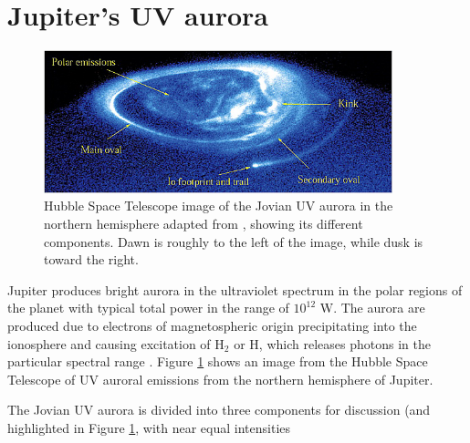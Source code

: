 \section{Jupiter's UV aurora}

\begin{figure}
    \centering
    \includegraphics[width=0.9\textwidth]{images1/jupiter-uv-aurora-1.png}
    \caption{Hubble Space Telescope image of the Jovian UV aurora in the northern hemisphere adapted from \protect{}, showing its different components. Dawn is roughly to the left of the image, while dusk is toward the right.}
    \label{fig:jupiter-uv-aurora}
\end{figure}

Jupiter produces bright aurora in the ultraviolet spectrum in the polar regions of the planet with typical total power in the range of $10^{12}$ W. The aurora are produced due to electrons of magnetospheric origin precipitating into the ionosphere and causing excitation of H$_2$ or H, which releases photons in the particular spectral range \cite{Grodent2015}. Figure \ref{fig:jupiter-uv-aurora} shows an image from the Hubble Space Telescope of UV auroral emissions from the northern hemisphere of Jupiter.

The Jovian UV aurora is divided into three components for discussion (and highlighted in Figure 
\ref{fig:jupiter-uv-aurora}, with near equal intensities

